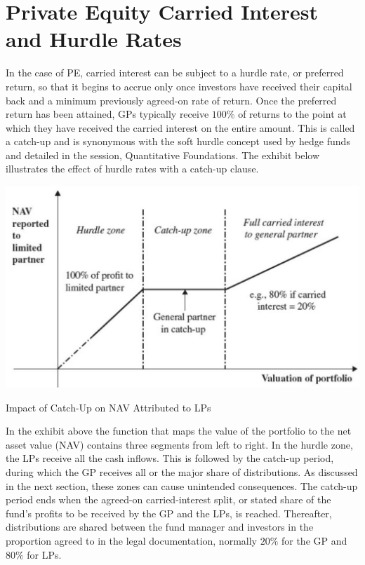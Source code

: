 \documentclass[11pt]{article}
\begin{document}
\section*{Private Equity Carried Interest and Hurdle Rates}
In the case of PE, carried interest can be subject to a hurdle rate, or preferred return, so that it begins to accrue only once investors have received their capital back and a minimum previously agreed-on rate of return. Once the preferred return has been attained, GPs typically receive $100 \%$ of returns to the point at which they have received the carried interest on the entire amount. This is called a catch-up and is synonymous with the soft hurdle concept used by hedge funds and detailed in the session, Quantitative Foundations. The exhibit below illustrates the effect of hurdle rates with a catch-up clause.

\begin{center}
\includegraphics[max width=\textwidth]{2024_04_10_afcfe94612d988da8947g-3}
\end{center}

Impact of Catch-Up on NAV Attributed to LPs

In the exhibit above the function that maps the value of the portfolio to the net asset value (NAV) contains three segments from left to right. In the hurdle zone, the LPs receive all the cash inflows. This is followed by the catch-up period, during which the GP receives all or the major share of distributions. As discussed in the next section, these zones can cause unintended consequences. The catch-up period ends when the agreed-on carried-interest split, or stated share of the fund's profits to be received by the GP and the LPs, is reached. Thereafter, distributions are shared between the fund manager and investors in the proportion agreed to in the legal documentation, normally $20 \%$ for the GP and $80 \%$ for LPs.
\end{document}
